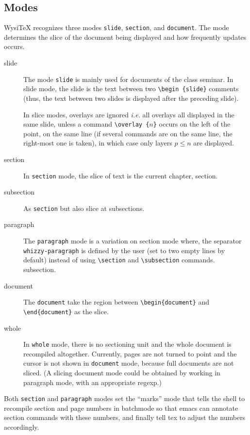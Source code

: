 \documentclass{article}
\let \lst \verb
\begin{document}
\subsection {Modes} 
\label {modes}

WysiTeX recognizes three modes \lst"slide", \lst"section", and \lst"document". 
The mode determines the slice of the document being displayed and how
frequently updates occurs. 
\begin{description}

\item [slide]

The mode \lst"slide"  is mainly used for documents of the class seminar. 
In slide mode, the slide is the text between two \lst"\begin {slide}"
comments (thus,  the text between two slides is displayed after the
preceding slide).  

In slice modes, overlays are ignored {\em i.e.} all overlays all displayed in
the same slide, unless a command
\lst"\overlay {"$n$\lst"}" occurs on the left of the point, on the same line
(if several commands are on the same line, the 
right-most one is taken), in which case only layers $p \le n$ are displayed.

\item [section]
In \lst"section" mode, the slice of text is the current chapter, section.

\item [subsection]
As \lst"section" but also slice at subsections. 

\item [paragraph]
The \lst"paragraph" mode is a variation on section mode where, the separator
\lst"whizzy-paragraph" is defined by the user (set to two empty lines by
default) instead of using \lst"\section"  and \lst"\subsection" commands. 
subsection.

\item [document]
The \lst"document" take the region between \lst"\begin{document}"
and \lst"\end"\lst"{document}" as the slice. 

\item [whole]
In \lst"whole" mode, there is no sectioning unit and the whole document is
recompiled altogether. Currently, pages are not turned to point and the 
cursor is not shown in \lst"document" mode, because full documents are not
sliced. (A slicing document mode could be obtained by working in paragraph
mode, with an appropriate regexp.)

\end{description}
Both \lst"section" and \lst"paragraph" modes set the ``marks'' mode
that tells the shell to recompile section and page numbers in batchmode
so that emacs can annotate section commands with these numbers, and
finally tell tex to adjust the numbers accordingly.
\end{document}
